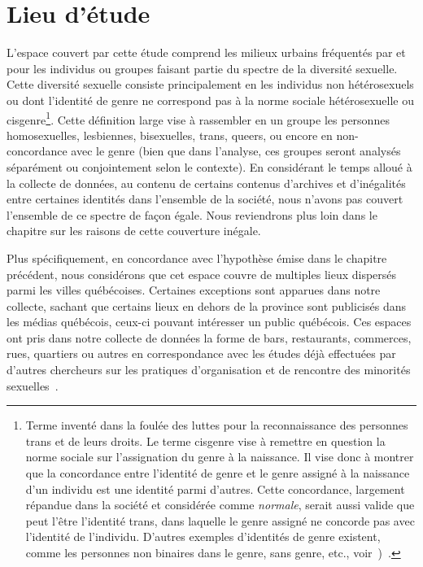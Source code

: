\section{Lieu d'étude}
\label{sec:lieu_d_tude}
L'espace couvert par cette étude comprend les milieux urbains fréquentés par et pour les individus ou groupes faisant partie du spectre de la diversité sexuelle.
Cette diversité sexuelle consiste principalement en les individus non hétérosexuels ou dont l'identité de genre ne correspond pas à la norme sociale hétérosexuelle ou cisgenre\footnote{Terme inventé dans la foulée des luttes pour la reconnaissance des personnes trans et de leurs droits.
 Le terme cisgenre vise à remettre en question la norme sociale sur l'assignation du genre à la naissance.
 Il vise donc à montrer que la concordance entre l'identité de genre et le genre assigné à la naissance d'un individu est une identité parmi d'autres.
 Cette concordance, largement répandue dans la société et considérée comme \emph{normale}, serait aussi valide que peut l'être l'identité trans, dans laquelle le genre assigné ne concorde pas avec l'identité de l'individu.
D'autres exemples d'identités de genre existent, comme les personnes non binaires dans le genre, sans genre, etc., voir~\cite{Barker2015})~\citep[150]{McGeeney2015}.}.
Cette définition large vise à rassembler en un groupe les personnes homosexuelles, lesbiennes, bisexuelles, trans, queers, ou encore en non-concordance avec le genre (bien que dans l'analyse, ces groupes seront analysés séparément ou conjointement selon le contexte).
En considérant le temps alloué à la collecte de données, au contenu de certains contenus d'archives et d'inégalités entre certaines identités dans l'ensemble de la société, nous n'avons pas couvert l'ensemble de ce spectre de façon égale.
Nous reviendrons plus loin dans le chapitre sur les raisons de cette couverture inégale.

Plus spécifiquement, en concordance avec l'hypothèse émise dans le chapitre précédent, nous considérons que cet espace couvre de multiples lieux dispersés parmi les villes québécoises.
Certaines exceptions sont apparues dans notre collecte, sachant que certains lieux en dehors de la province sont publicisés dans les médias québécois, ceux-ci pouvant intéresser un public québécois.
Ces espaces ont pris dans notre collecte de données la forme de bars, restaurants, commerces, rues, quartiers ou autres en correspondance avec les études déjà effectuées par d'autres chercheurs sur les pratiques d'organisation et de rencontre des minorités sexuelles~\citep{Higgins1999,Hinrichs2012}.

